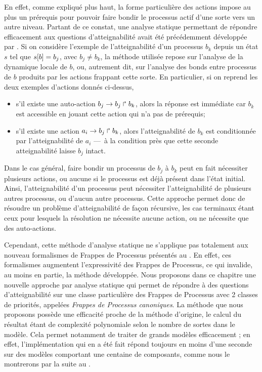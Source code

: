 En effet, comme expliqué plus haut,
la forme particulière des actions impose au plus un prérequis pour pouvoir faire bondir
le processus actif d'une sorte vers un autre niveau.
Partant de ce constat, une analyse statique permettant de répondre efficacement aux
questions d'atteignabilité avait été précédemment développée par .
Si on considère l'exemple de l'atteignabilité d'un processus $b_k$ depuis un état $s$
tel que ${s[b]} = b_j$, avec $b_j \neq b_k$,
la méthode utilisée repose sur l'analyse de la dynamique locale de $b$, ou, autrement dit,
sur l'analyse des bonds entre processus de $b$ produits par les actions frappant cette sorte.
En particulier, si on reprend les deux exemples d'actions donnés ci-dessus,
\begin{itemize}
  \item s'il existe une auto-action $b_j\rightarrow b_j\Rsh b_k$, alors la réponse est immédiate
    car $b_k$ est accessible en jouant cette action qui n'a pas de prérequis;
  \item s'il existe une action $a_i\rightarrow b_j\Rsh b_k$, alors l'atteignabilité de $b_k$
    est conditionnée par l'atteignabilité de $a_i$ ---~à la condition près que cette
    seconde atteignabilité laisse $b_j$ intact.
\end{itemize}
Dans le cas général, faire bondir un processus de $b_j$ à $b_k$ peut en fait nécessiter plusieurs
actions, ou aucune si le processus est déjà présent dans l'état initial.
Ainsi, l'atteignabilité d'un processus peut nécessiter l'atteignabilité de plusieurs
autres processus, ou d'aucun autre processus.
Cette approche permet donc de résoudre un problème d'atteignabilité de façon récursive,
les cas terminaux étant ceux pour lesquels la résolution ne nécessite aucune action,
ou ne nécessite que des auto-actions.

\myskip

Cependant, cette méthode d'analyse statique ne s'applique pas totalement aux nouveau formalismes
de Frappes de Processus présentés au .
En effet, ces formalismes augmentent l'expressivité des Frappes de Processus,
ce qui invalide, au moins en partie, la méthode développée.
Nous proposons dans ce chapitre une nouvelle approche par analyse statique qui permet
de répondre à des questions d'atteignabilité sur une classe particulière des Frappes de Processus
avec 2 classes de priorités, appelées \emph{Frappes de Processus canoniques}.
La méthode que nous proposons possède une efficacité proche de la méthode d'origine,
le calcul du résultat étant de complexité polynomiale selon le nombre de sortes dans le modèle.
Cela permet notamment de traiter de grands modèles efficacement ;
en effet, l'implémentation qui en a été fait répond toujours en moins d'une seconde
sur des modèles comportant une centaine de composants,
comme nous le montrerons par la suite au .

